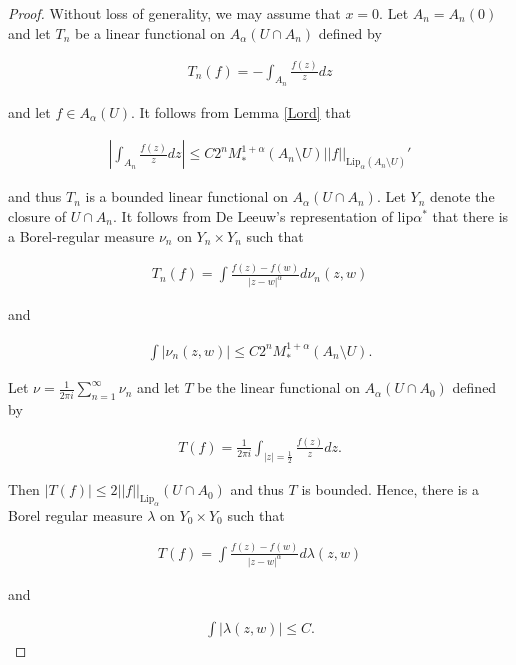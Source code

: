 \documentclass[10pt,a4paper]{amsart}
\begin{document}
\begin{proof}
    Without loss of generality, we may assume that $x=0$. Let $A_n = A_n(0)$ and let $T_n$ be a linear functional on $A_\alpha(U \cap A_n)$ defined by

\begin{align*}
    T_n(f) = -\int_{A_n} \frac{f(z)}{z} dz
\end{align*}

\noindent and let $f \in A_\alpha(U)$. It follows from Lemma \ref{Lord} that 

\begin{align*}
    \left| \int_{A_n} \frac{f(z)}{z} dz \right| \leq C 2^n M_*^{1+\alpha}(A_n \setminus U) ||f||_{\text{Lip}_{\alpha}(A_n \setminus U)}'
\end{align*}


\noindent and thus $T_n$ is a bounded linear functional on $A_{\alpha}(U \cap A_n)$. Let $Y_n$ denote the closure of $U \cap A_n$. It follows from De Leeuw's representation of lip$\alpha^*$ that there is a Borel-regular measure $\nu_n$ on $Y_n \times Y_n$ such that

\begin{align*}
    T_n(f) = \int \frac{f(z)-f(w)}{|z-w|^{\alpha}} d\nu_n(z,w)
\end{align*}


\noindent and 

\begin{align*}
    \int |\nu_n(z,w)| \leq C 2^n M_*^{1+\alpha}(A_n \setminus U).
\end{align*}

\noindent Let $\displaystyle \nu = \frac{1}{2\pi i} \sum_{n=1}^{\infty} \nu_n$ and let $T$ be the linear functional on $A_\alpha(U \cap A_0)$ defined by 

\begin{align*}
    T(f) = \frac{1}{2\pi i}\int_{|z|=\frac{1}{2}} \frac{f(z)}{z} dz.
\end{align*}

\noindent Then $|T(f)| \leq 2||f||_{\text{Lip}_{\alpha}}(U \cap A_0)$ and thus $T$ is bounded. Hence, there is a Borel regular measure $\lambda$ on $Y_0 \times Y_0$ such that 

\begin{align*}
    T(f) = \int \frac{f(z)-f(w)}{|z-w|^{\alpha}} d\lambda(z,w)
\end{align*}

\noindent and 

\begin{align*}
    \int |\lambda(z,w)| \leq C.
\end{align*}



\end{proof}
\end{document}
